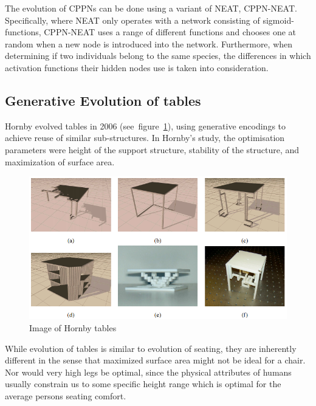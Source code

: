 The evolution of CPPNs can be done using a variant of NEAT, 
CPPN-NEAT.
Specifically, where NEAT only operates with a network consisting of 
sigmoid-functions, CPPN-NEAT uses a range of different functions and chooses 
one at random when a new node is introduced into the network.
Furthermore, when determining if two individuals belong to the same species, 
the differences in which activation functions their hidden nodes use is taken 
into consideration.


\subsection{Generative Evolution of tables}
Hornby evolved tables in 2006\cite{paper:ev4} 
(see~figure~\ref{fig:hornby_tables}), using
generative encodings to achieve reuse of similar sub-structures.
In Hornby's study, the optimisation parameters were height of the support
structure, stability of the structure, and maximization of surface area.
\begin{figure}[ht]
\includegraphics[scale=.6]{content/img/tables}
\caption{Image of Hornby tables\cite{paper:ev4}}
\label{fig:hornby_tables}
\end{figure}

While evolution of tables is similar to evolution of seating, they are
inherently different in the sense that maximized surface area might not be ideal
for a chair. Nor would very high legs be optimal, since the physical
attributes of humans usually constrain us to some specific height range which is
optimal for the average persons seating comfort.

